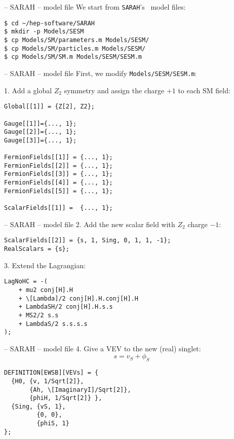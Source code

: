 \documentclass[11pt]{beamer}
\newcommand{\SARAH}{\texttt{SARAH}}
\newcommand{\SM}{\text{SM}}
\begin{document}

\begin{frame}[fragile]{\insertsection -- SARAH -- model file}
  We start from \SARAH's \SM\ model files:
  \begin{lstlisting}
$ cd ~/hep-software/SARAH
$ mkdir -p Models/SESM
$ cp Models/SM/parameters.m Models/SESM/
$ cp Models/SM/particles.m Models/SESM/
$ cp Models/SM/SM.m Models/SESM/SESM.m\end{lstlisting}%
\end{frame}


\begin{frame}[fragile]{\insertsection -- SARAH -- model file}
  First, we modify \texttt{Models/SESM/SESM.m}:

  \medskip

  1. Add a global $Z_2$ symmetry and assign the charge $+1$ to each SM
  field:
  \begin{lstlisting}
Global[[1]] = {Z[2], Z2};

Gauge[[1]]={..., 1};
Gauge[[2]]={..., 1};
Gauge[[3]]={..., 1};

FermionFields[[1]] = {..., 1};  
FermionFields[[2]] = {..., 1};
FermionFields[[3]] = {..., 1};
FermionFields[[4]] = {..., 1};
FermionFields[[5]] = {..., 1};

ScalarFields[[1]] =  {..., 1};\end{lstlisting}
\end{frame}


\begin{frame}[fragile]{\insertsection -- SARAH -- model file}
  2. Add the new scalar field with $Z_2$ charge $-1$:
  \begin{lstlisting}
ScalarFields[[2]] = {s, 1, Sing, 0, 1, 1, -1};
RealScalars = {s};\end{lstlisting}
  3. Extend the Lagrangian:
  \begin{lstlisting}
LagNoHC = -(
    + mu2 conj[H].H
    + \[Lambda]/2 conj[H].H.conj[H].H
    + LambdaSH/2 conj[H].H.s.s
    + MS2/2 s.s
    + LambdaS/2 s.s.s.s
);\end{lstlisting}
\end{frame}


\begin{frame}[fragile]{\insertsection -- SARAH -- model file}
  4. Give a VEV to the new (real) singlet:
  \begin{equation*}
    s = v_S + \phi_S
  \end{equation*}
  \begin{lstlisting}
DEFINITION[EWSB][VEVs] = {
  {H0, {v, 1/Sqrt[2]},
       {Ah, \[ImaginaryI]/Sqrt[2]},
       {phiH, 1/Sqrt[2]} },
  {Sing, {vS, 1},
         {0, 0},
         {phiS, 1}
};\end{lstlisting}
\end{frame}
\end{document}
